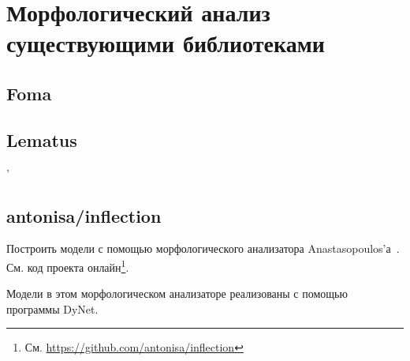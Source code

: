 \section{Морфологический анализ существующими библиотеками} \label{sect_exp_libs}

\subsection{Foma} \label{sect_exp_foma}


\subsection{Lematus} \label{sect_exp_lematus}'




\subsection{antonisa/inflection}

Построить модели с помощью морфологического анализатора 
Anastasopoulos'а~\cite{Anastasopoulos2019Pushing_Limits_Low-Resource_MI}.
См. код проекта онлайн\footnote{См. \url{https://github.com/antonisa/inflection}}. 

Модели в этом морфологическом анализаторе реализованы с помощью программы DyNet. 




